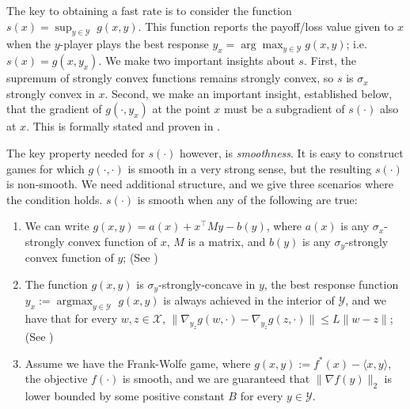 \documentclass[pmlr]{jmlr} %
\def\argmax{\mathop{\arg\max}}
\def\BR{\textsc{BestResponse}\xspace}
\newcommand{\yx}[1]{y_{#1}}
\newcommand{\XX}{\mathcal{X}}
\newcommand{\YY}{\mathcal{Y}}
\begin{document}



The key to obtaining a fast rate is to consider the function $s(x) = \sup_{y \in \YY}\; g(x,y).$ This function reports the payoff/loss value given to $x$ when the $y$-player plays the best response $\yx{x} = \arg\max_{y \in \YY} g(x,y)$; i.e. $s(x) = g(x,\yx{x})$. We make two important insights about $s$. First, the supremum of strongly convex functions remains strongly convex, so $s$ is $\sigma_{x}$ strongly convex in $x$. Second, we make an important insight, established below, that the gradient of $g(\cdot, y_{x})$ at the point $x$ must be a subgradient of $s(\cdot)$ also at $x$. This is formally stated and proven in .



The key property needed for $s(\cdot)$ however, is \emph{smoothness}. It is easy to construct games for which $g(\cdot,\cdot)$ is smooth in a very strong sense, but the resulting $s(\cdot)$ is non-smooth. We need additional structure, and we give three scenarios where the condition holds. $s(\cdot)$ is smooth when any of the following are true:
\begin{enumerate}[itemsep=0mm]
    \item We can write $g( x, y ) = a(x) +  x^{\top} M y - b(y)$, where $a(x)$ is any $\sigma_{x}$-strongly convex function of $x$, $M$ is a matrix, and $b(y)$ is any $\sigma_{y}$-strongly convex function of $y$; (See )
  \item The function $g(x,y)$ is $\sigma_{y}$-strongly-concave in $y$, the best response function $y_{x} := \argmax_{y \in \YY}$ $g(x,y)$ is always achieved in the interior of $\YY$, and we have that for every $w,z \in \XX$,  $\| \nabla_{\yx{z}} g(w,\cdot) - \nabla_{\yx{z}} g(z,\cdot)   \| \le L \| w - z \|$; (See )
  \item Assume we have the Frank-Wolfe game, where $g(x,y) := f^{*}(x) - \langle x, y \rangle$, the objective $f(\cdot)$ is smooth, and we are guaranteed that $\|\nabla f(y)\|_{2}$ is lower bounded by some positive constant $B$ for every $y \in \YY$.
\end{enumerate}
\end{document}
